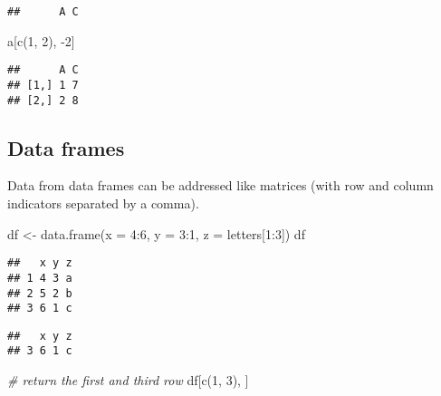 \documentclass[
]{book}
\newenvironment{Shaded}{\begin{snugshade}}{\end{snugshade}}
\newcommand{\AttributeTok}[1]{\textcolor[rgb]{0.77,0.63,0.00}{#1}}
\newcommand{\CommentTok}[1]{\textcolor[rgb]{0.56,0.35,0.01}{\textit{#1}}}
\newcommand{\DecValTok}[1]{\textcolor[rgb]{0.00,0.00,0.81}{#1}}
\newcommand{\FunctionTok}[1]{\textcolor[rgb]{0.00,0.00,0.00}{#1}}
\newcommand{\NormalTok}[1]{#1}
\newcommand{\OtherTok}[1]{\textcolor[rgb]{0.56,0.35,0.01}{#1}}
\newcommand{\SpecialCharTok}[1]{\textcolor[rgb]{0.00,0.00,0.00}{#1}}
\begin{document}
\begin{verbatim}
##      A C
\end{verbatim}

\begin{Shaded}
\begin{Highlighting}[]
\NormalTok{a[}\FunctionTok{c}\NormalTok{(}\DecValTok{1}\NormalTok{, }\DecValTok{2}\NormalTok{), }\SpecialCharTok{{-}}\DecValTok{2}\NormalTok{]}
\end{Highlighting}
\end{Shaded}

\begin{verbatim}
##      A C
## [1,] 1 7
## [2,] 2 8
\end{verbatim}

\hypertarget{data-frames}{%
\subsection{Data frames}\label{data-frames}}

Data from data frames can be addressed like matrices (with row and column indicators separated by a comma).

\begin{Shaded}
\begin{Highlighting}[]
\NormalTok{df }\OtherTok{\textless{}{-}} \FunctionTok{data.frame}\NormalTok{(}\AttributeTok{x =} \DecValTok{4}\SpecialCharTok{:}\DecValTok{6}\NormalTok{, }\AttributeTok{y =} \DecValTok{3}\SpecialCharTok{:}\DecValTok{1}\NormalTok{, }\AttributeTok{z =}\NormalTok{ letters[}\DecValTok{1}\SpecialCharTok{:}\DecValTok{3}\NormalTok{])}
\NormalTok{df}
\end{Highlighting}
\end{Shaded}

\begin{verbatim}
##   x y z
## 1 4 3 a
## 2 5 2 b
## 3 6 1 c
\end{verbatim}

\begin{Shaded}
\end{Shaded}

\begin{verbatim}
##   x y z
## 3 6 1 c
\end{verbatim}

\begin{Shaded}
\begin{Highlighting}[]
\CommentTok{\# return the first and third row}
\NormalTok{df[}\FunctionTok{c}\NormalTok{(}\DecValTok{1}\NormalTok{, }\DecValTok{3}\NormalTok{), ]}
\end{Highlighting}
\end{Shaded}
\end{document}

